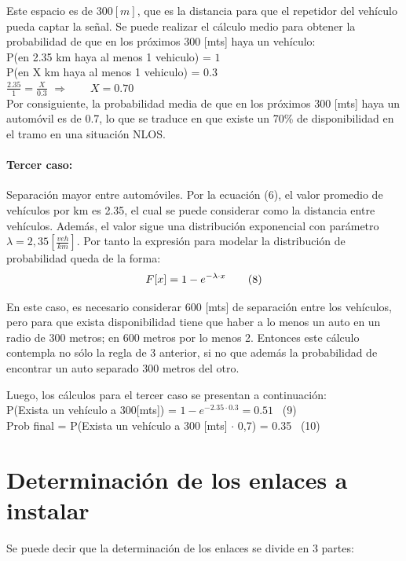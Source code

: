 \documentclass[12pt]{article}
\begin{document}
Este espacio es de $300[m]$, que es la distancia para que el repetidor del vehículo pueda captar la señal. 
Se puede realizar el cálculo medio para obtener la probabilidad de que en los próximos 300 [mts] haya un 
vehículo:\\

P(en 2.35 km haya al menos 1 vehiculo) = $1$ \\            

P(en X km haya al menos 1 vehiculo) = $0.3$  \\        

\Large $\frac{2.35}{1} = \frac{X}{0.3}$ \normalsize \qquad $\Rightarrow \qquad X = 0.70$\\

Por consiguiente, la probabilidad media de que en los próximos 300 [mts] haya un automóvil es de 0.7, 
lo que se traduce en que existe un 70\% de disponibilidad en el tramo en una situación NLOS.\\
\paragraph{Tercer caso:} Separación mayor entre automóviles.
Por la ecuación (6), el valor promedio de vehículos por km es 2.35, el cual se puede considerar como 
la distancia entre vehículos. Además, el valor sigue una distribución exponencial con parámetro 
$\lambda=2,35 [\frac{veh}{km}]$. Por tanto la expresión para modelar la distribución de probabilidad queda 
de la forma:
$$ F[x]= 1-e^{-\lambda \cdot x} \qquad \tiny (8)$$

En este caso, es necesario considerar 600 [mts] de separación entre los vehículos, pero para que exista 
disponibilidad tiene que haber a lo menos un auto en un radio de 300 metros; en 600 metros por lo menos 2.
Entonces este cálculo contempla no sólo la regla de 3 anterior, si no que además la probabilidad de 
encontrar un auto separado 300 metros del otro.

Luego, los cálculos para el tercer caso se presentan a continuación:\\

P(Exista un vehículo a 300[mts]) = $1-e^{-2.35 \cdot 0.3} = 0.51$ \qquad \ \qquad (9)\\

Prob final = P(Exista un vehículo a 300 [mts] $\cdot$ 0,7) = 0.35 \qquad \ \qquad (10)

\newpage
\section{Determinación de los enlaces a instalar}
Se puede decir que la determinación de los enlaces se divide en 3 partes:
\end{document}
